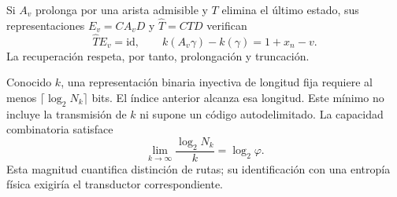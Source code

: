 Si $A_v$ prolonga por una arista admisible y $T$ elimina el último estado,
sus representaciones $E_v=C A_v D$ y $\widehat T=C T D$ verifican
\[
 \widehat T E_v=\mathrm{id},\qquad
 k(A_v\gamma)-k(\gamma)=1+x_n-v.
\]
La recuperación respeta, por tanto, prolongación y truncación.

Conocido $k$, una representación binaria inyectiva de longitud fija requiere
al menos $\lceil\log_2N_k\rceil$ bits. El índice anterior alcanza esa
longitud. Este mínimo no incluye la transmisión de $k$ ni supone un
código autodelimitado. La capacidad combinatoria satisface
\[
 \lim_{k\to\infty}\frac{\log_2N_k}{k}=\log_2\varphi.
\]
Esta magnitud cuantifica distinción de rutas; su identificación con
una entropía física exigiría el transductor correspondiente.

